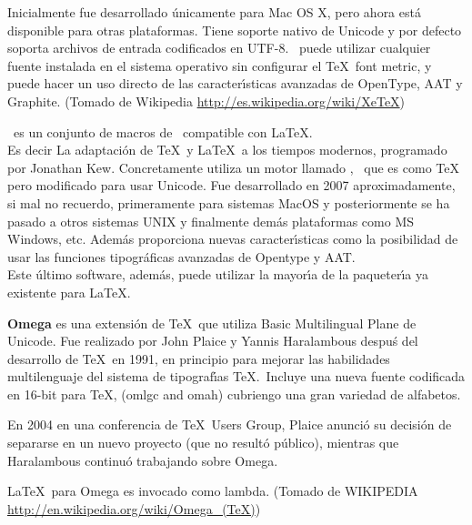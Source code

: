 \begin{lista}
Inicialmente fue desarrollado \'unicamente para Mac OS X, pero ahora est\'a disponible para otras plataformas. Tiene soporte nativo de Unicode y por defecto soporta archivos de entrada codificados en UTF-8. \XeTeX \, puede utilizar cualquier fuente instalada en el sistema operativo sin configurar el \TeX \, font metric, y puede hacer un uso directo de las caracter\'{\i}sticas avanzadas de OpenType, AAT y Graphite. (Tomado de Wikipedia \url{http://es.wikipedia.org/wiki/XeTeX})
\item \XeLaTeX \, es un conjunto de macros de \XeTeX \, compatible con \LaTeX.\\
Es decir La adaptaci\'on de \TeX \, y \LaTeX \, a los tiempos modernos, programado por Jonathan Kew. Concretamente utiliza un motor llamado \XeTeX , \, que es como \TeX \, pero modificado para usar Unicode. Fue desarrollado en 2007 aproximadamente, si mal no recuerdo, primeramente para sistemas MacOS y posteriormente se ha pasado a otros sistemas UNIX y finalmente dem\'as plataformas como MS Windows, etc. Adem\'as proporciona nuevas caracter\'{\i}sticas como la posibilidad de usar las funciones tipogr\'aficas avanzadas de Opentype y AAT.\\
Este \'ultimo software, adem\'as, puede utilizar la mayor\'{\i}a de la paqueter\'{\i}a ya existente para \LaTeX.
% 
%
\item {\bf Omega} es una extensi\'on de \TeX\, que utiliza Basic Multilingual Plane de Unicode. Fue realizado por John Plaice y Yannis Haralambous despu\'s del desarrollo de \TeX\, en 1991, en principio para mejorar las habilidades multilenguaje del sistema de tipograf\'{\i}as \TeX.\, Incluye una nueva fuente codificada en 16-bit para TeX, (omlgc and omah) cubriengo una gran variedad de alfabetos.

En 2004 en una conferencia de \TeX \, Users Group, Plaice anunci\'o su decisi\'on de separarse en un nuevo proyecto (que no result\'o p\'ublico), mientras que Haralambous continu\'o trabajando sobre Omega.

\LaTeX \, para Omega es invocado como lambda. (Tomado de WIKIPEDIA \url{http://en.wikipedia.org/wiki/Omega_(TeX)})


\end{lista}
